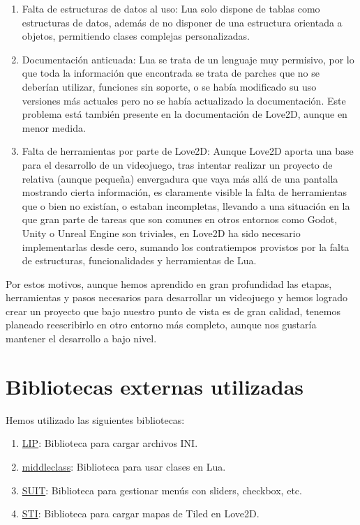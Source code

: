 \documentclass[12pt, spanish]{article}
\begin{document}
\begin{enumerate}
	\item Falta de estructuras de datos al uso: Lua solo dispone de tablas como estructuras de datos, además de no disponer de una estructura orientada a objetos, permitiendo clases complejas personalizadas.
	\item Documentación anticuada: Lua se trata de un lenguaje muy permisivo, por lo que toda la información que encontrada se trata de parches que no se deberían utilizar, funciones sin soporte, o se había modificado su uso versiones más actuales pero no se había actualizado la documentación. Este problema está también presente en la documentación de Love2D, aunque en menor medida.
	\item Falta de herramientas por parte de Love2D: Aunque Love2D aporta una base para el desarrollo de un videojuego, tras intentar realizar un proyecto de relativa (aunque pequeña) envergadura que vaya más allá de una pantalla mostrando cierta información, es claramente visible la falta de herramientas que o bien no existían, o estaban incompletas, llevando a una situación en la que gran parte de tareas que son comunes en otros entornos como Godot, Unity o Unreal Engine son triviales, en Love2D ha sido necesario implementarlas desde cero, sumando los contratiempos provistos por la falta de estructuras, funcionalidades y herramientas de Lua.
\end{enumerate}

Por estos motivos, aunque hemos aprendido en gran profundidad las etapas, herramientas y pasos necesarios para desarrollar un videojuego y hemos logrado crear un proyecto que bajo nuestro punto de vista es de gran calidad, tenemos planeado reescribirlo en otro entorno más completo, aunque nos gustaría mantener el desarrollo a bajo nivel.

\section{Bibliotecas externas utilizadas}

Hemos utilizado las siguientes bibliotecas:

\begin{enumerate}
	\item \href{https://github.com/Dynodzzo/Lua_INI_Parser}{LIP}: Biblioteca para cargar archivos INI.
	\item \href{https://github.com/kikito/middleclass}{middleclass}: Biblioteca para usar clases en Lua.
	\item \href{https://github.com/vrld/suit}{SUIT}: Biblioteca para gestionar menús con sliders, checkbox, etc.
	\item \href{https://github.com/karai17/Simple-Tiled-Implementation}{STI}: Biblioteca para cargar mapas de Tiled en Love2D.
\end{enumerate}
\end{document}
